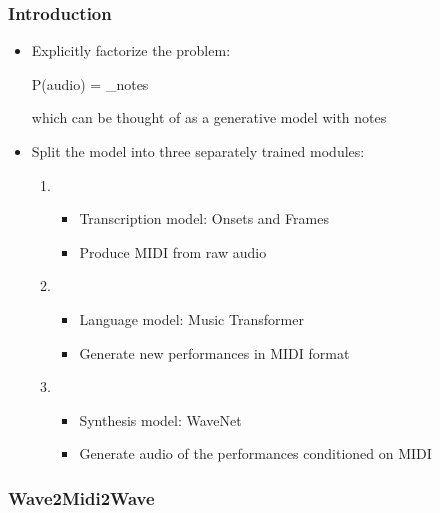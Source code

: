\documentclass[dvipdfmx]{beamer}
\begin{document}
\begin{frame}
    \frametitle{Introduction}
    \begin{itemize}
        \item Explicitly factorize the problem:
            \begin{yalign}
                P(audio) = _{notes}
            \end{yalign}
            which can be thought of as a generative model with notes
        \item Split the model into three separately trained modules:
        \begin{enumerate}
            \item {}
            \begin{itemize}
                 \item Transcription model: Onsets and Frames \cite{onsetandframes}
                 \item Produce MIDI from raw audio
            \end{itemize}
            \item {}
            \begin{itemize}
                \item Language model: Music Transformer \cite{musictransformer}
                \item Generate new performances in MIDI format
            \end{itemize}
            \item {}
            \begin{itemize}
                \item Synthesis model: WaveNet \cite{wavenet}
                \item Generate audio of the performances conditioned on MIDI
            \end{itemize}
        \end{enumerate}
    \end{itemize}
\end{frame}


\begin{frame}
    \frametitle{Wave2Midi2Wave}
\end{frame}
\end{document}
